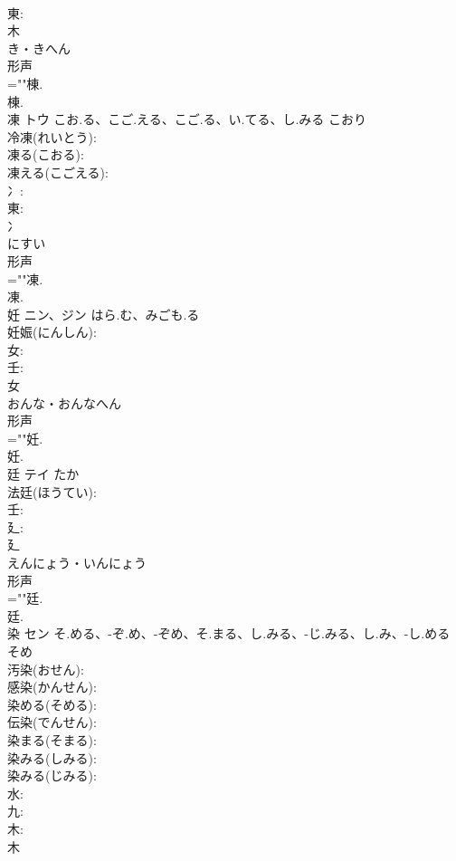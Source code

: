 \documentclass[8pt]{extreport}
\begin{document}
\begin{CJK}{UTF8}{min}
\\	東: 
\\	木	
\\	き・きへん	
\\	形声 
\\	=""棟.
\\	棟.
\\	凍	トウ	こお.る、こご.える、こご.る、い.てる、し.みる	こおり	
\\	冷凍(れいとう): 
\\	凍る(こおる): 
\\	凍える(こごえる): 
\\	冫: 
\\	東: 
\\	冫	
\\	にすい	
\\	形声 
\\	=""凍.
\\	凍.
\\	妊	ニン、ジン	はら.む、みごも.る		
\\	妊娠(にんしん): 
\\	女: 
\\	壬: 
\\	女	
\\	おんな・おんなへん	
\\	形声 
\\	=""妊.
\\	妊.
\\	廷	テイ		たか	
\\	法廷(ほうてい): 
\\	壬: 
\\	廴: 
\\	廴	
\\	えんにょう・いんにょう	
\\	形声 
\\	=""廷.
\\	廷.
\\	染	セン	そ.める、-ぞ.め、-ぞめ、そ.まる、し.みる、-じ.みる、し.み、-し.める	そめ	
\\	汚染(おせん): 
\\	感染(かんせん): 
\\	染める(そめる): 
\\	伝染(でんせん): 
\\	染まる(そまる): 
\\	染みる(しみる): 
\\	染みる(じみる): 
\\	水: 
\\	九: 
\\	木: 
\\	木	

\end{CJK}
\end{document}
